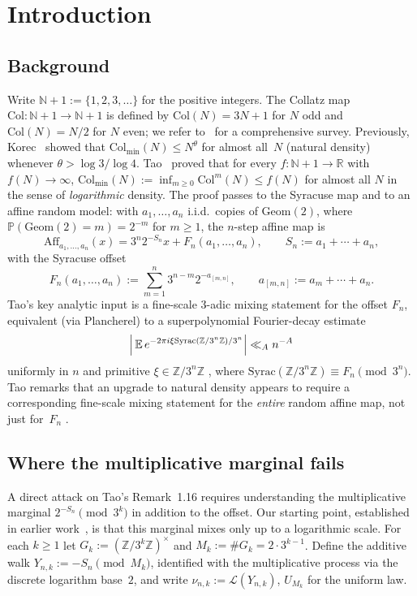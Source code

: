 \documentclass[11pt,a4paper]{amsart}
\theoremstyle{plain}
\theoremstyle{definition}
\newcommand{\N}{\mathbb{N}}
\newcommand{\Z}{\mathbb{Z}}
\newcommand{\R}{\mathbb{R}}
\newcommand{\E}{\mathbb{E}}
\newcommand{\PP}{\mathbb{P}}
\newcommand{\Col}{\mathrm{Col}}
\newcommand{\Aff}{\mathrm{Aff}}
\newcommand{\Geom}{\mathrm{Geom}}
\newcommand{\Syrac}{\mathrm{Syrac}}
\begin{document}
\section{Introduction}

\subsection{Background}
Write $\N+1:=\{1,2,3,\dots\}$ for the positive integers.
The Collatz map $\Col\colon\N+1\to\N+1$ is defined by
$\Col(N)=3N+1$ for $N$ odd and $\Col(N)=N/2$ for $N$ even;
we refer to~\cite{Lagarias} for a comprehensive survey.
Previously, Korec~\cite{Korec} showed that
$\Col_{\min}(N)\le N^\theta$ for almost all~$N$ (natural density)
whenever $\theta>\log 3/\log 4$.
Tao~\cite{Tao} proved that for every $f\colon\N+1\to\R$ with $f(N)\to\infty$,
$\Col_{\min}(N):=\inf_{m\ge0}\Col^m(N)\le f(N)$
for almost all $N$ in the sense of \emph{logarithmic} density.
The proof passes to the Syracuse map and to an affine random model: with
$a_1,\dots,a_n$ i.i.d.\ copies of $\Geom(2)$, where $\PP(\Geom(2)=m)=2^{-m}$
for $m\ge1$, the $n$-step affine map is
\begin{equation}\label{eq:affine}
\Aff_{a_1,\dots,a_n}(x)=3^n2^{-S_n}x+F_n(a_1,\dots,a_n),
\qquad S_n:=a_1+\cdots+a_n,
\end{equation}
with the Syracuse offset
\begin{equation}\label{eq:Fn}
F_n(a_1,\dots,a_n):=\sum_{m=1}^n3^{n-m}2^{-a_{[m,n]}},
\qquad a_{[m,n]}:=a_m+\cdots+a_n.
\end{equation}
Tao's key analytic input is a fine-scale $3$-adic mixing statement for the
offset $F_n$, equivalent (via Plancherel) to a superpolynomial Fourier-decay
estimate
\begin{equation}\label{eq:tao117}
\Bigl|\,\E\,e^{-2\pi i\xi\Syrac(\Z/3^n\Z)/3^n}\Bigr|\ll_A n^{-A}
\end{equation}
uniformly in $n$ and primitive $\xi\in\Z/3^n\Z$
\cite[Prop.~1.17]{Tao}, where $\Syrac(\Z/3^n\Z)\equiv F_n\pmod{3^n}$.
Tao remarks that an upgrade to natural density appears to require a
corresponding fine-scale mixing statement for the \emph{entire} random affine
map, not just for~$F_n$ \cite[Rem.~1.16]{Tao}.

\subsection{Where the multiplicative marginal fails}
A direct attack on Tao's Remark~1.16 requires understanding the
multiplicative marginal $2^{-S_n}\pmod{3^k}$ in addition to the offset.
Our starting point, established in earlier work~\cite{SiNote}, is that this
marginal mixes only up to a logarithmic scale.
For each $k\ge1$ let
$G_k:=(\Z/3^k\Z)^\times$ and $M_k:=\#G_k=2\cdot 3^{k-1}$.
Define the additive walk
$Y_{n,k}:=-S_n\pmod{M_k}$, identified with the multiplicative process via
the discrete logarithm base~$2$, and write $\nu_{n,k}:=\mathcal L(Y_{n,k})$,
$U_{M_k}$ for the uniform law.
\end{document}
